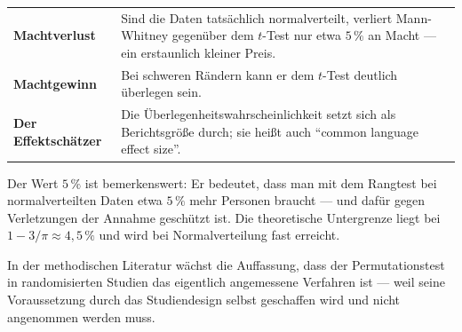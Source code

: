 \begin{forschung}
\begin{center}
{\small
\renewcommand{\arraystretch}{1.45}
\begin{tabular}{@{}P{2.6cm}P{5.6cm}@{}}
\toprule
\textbf{Machtverlust} & Sind die Daten tatsächlich normalverteilt, verliert Mann-Whitney gegenüber dem $t$-Test nur etwa $5\,\%$ an Macht --- ein erstaunlich kleiner Preis.\\
\textbf{Machtgewinn} & Bei schweren Rändern kann er dem $t$-Test deutlich überlegen sein.\\
\textbf{Der Effektschätzer} & Die Überlegenheitswahrscheinlichkeit setzt sich als Berichtsgröße durch; sie heißt auch \enquote{common language effect size}.\\
\bottomrule
\end{tabular}}
\end{center}

Der Wert $5\,\%$ ist bemerkenswert: Er bedeutet, dass man mit dem Rangtest bei normalverteilten Daten etwa $5\,\%$ mehr Personen braucht --- und dafür gegen Verletzungen der Annahme geschützt ist. Die theoretische Untergrenze liegt bei $1 - 3/\pi \approx 4{,}5\,\%$ und wird bei Normalverteilung fast erreicht.

In der methodischen Literatur wächst die Auffassung, dass der Permutationstest in randomisierten Studien das eigentlich angemessene Verfahren ist --- weil seine Voraussetzung durch das Studiendesign selbst geschaffen wird und nicht angenommen werden muss.

\begin{center}
\begin{minipage}{0.88\textwidth}
\end{minipage}
\end{center}
\end{forschung}

